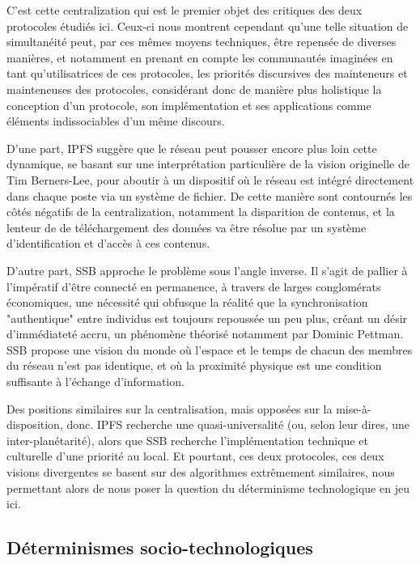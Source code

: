 \documentclass{article}
\begin{document}
C'est cette centralization qui est le premier objet des critiques des deux protocoles étudiés ici. Ceux-ci nous montrent cependant qu'une telle situation de simultanéité peut, par ces mêmes moyens techniques, être repensée de diverses manières, et notamment en prenant en compte les communautés imaginées en tant qu'utilisatrices de ces protocoles, les priorités discursives des mainteneurs et mainteneuses des protocoles, considérant donc de manière plus holistique la conception d'un protocole, son implémentation et ses applications comme éléments indissociables d'un même discours.

D'une part, IPFS suggère que le réseau peut pousser encore plus loin cette dynamique, se basant sur une interprétation particulière de la vision originelle de Tim Berners-Lee, pour aboutir à un dispositif où le réseau est intégré directement dans chaque poste via un système de fichier. De cette manière sont contournés les côtés négatifs de la centralization, notamment la disparition de contenus, et la lenteur de de téléchargement des données va être résolue par un système d'identification et d'accès à ces contenus.

D'autre part, SSB approche le problème sous l'angle inverse. Il s'agit de pallier à l'impératif d'être connecté en permanence, à travers de larges conglomérats économiques, une nécessité qui obfusque la réalité que la synchronisation "authentique" entre individus est toujours repoussée un peu plus, créant un désir d'immédiateté accru, un phénomène théorisé notamment par Dominic Pettman\cite{pettman_infinite_2015}. SSB propose une vision du monde où l'espace et le temps de chacun des membres du réseau n'est pas identique, et où la proximité physique est une condition suffisante à l'échange d'information.

Des positions similaires sur la centralisation, mais opposées sur la mise-à-disposition, donc. IPFS recherche une quasi-universalité (ou, selon leur dires, une inter-planétarité), alors que SSB recherche l'implémentation technique et culturelle d'une priorité au local. Et pourtant, ces deux protocoles, ces deux visions divergentes se basent sur des algorithmes extrêmement similaires, nous permettant alors de nous poser la question du déterminisme technologique en jeu ici.

\subsection{Déterminismes socio-technologiques}
\end{document}
